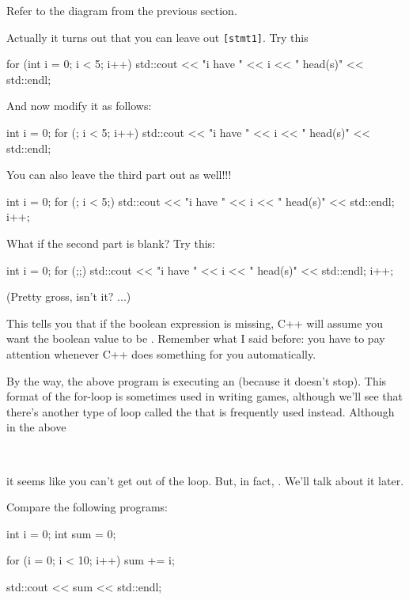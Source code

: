 \newpage{}

Refer to the diagram from the previous section.

Actually it turns out that you can leave out \texttt{[stmt1]}. Try this
\begin{console}
for (int i = 0; i < 5; i++)
{   
    std::cout << "i have " << i
              << " head(s)"
              << std::endl;
}
\end{console}
And now modify it as follows:
\begin{console}
int i = 0;
for (; i < 5; i++)
{   
    std::cout << "i have " << i
              << " head(s)"
              << std::endl;
}
\end{console}
You can also leave the third part out as well!!!
\begin{console}
int i = 0;
for (; i < 5;)
{   
    std::cout << "i have " << i
              << " head(s)"
              << std::endl;
    i++;
}
\end{console}
What if the second part is blank? Try this:
\begin{console}
int i = 0;
for (;;)
{   
    std::cout << "i have " << i
              << " head(s)"
              << std::endl;
    i++;
}
\end{console}
(Pretty gross, isn't it? ...)

This tells you that if the boolean expression is missing, C++ will
assume you want the boolean value to be . Remember
what I said before: you have to pay attention whenever C++ does
something for you automatically.

By the way, the above program is executing an 
(because it doesn't stop). This format of the for-loop is sometimes used in writing games, although we'll see that there's another type of loop called the
 that is frequently used instead. Although in the above

\\

it seems like you can't get out of the loop. But, in fact, . We'll talk
about it later.

\newpage{}

Compare the following programs:
\begin{console}
int i = 0;
int sum = 0;

for (i = 0; i < 10; i++)
{   
    sum += i;
}

std::cout << sum << std::endl;
\end{console}

